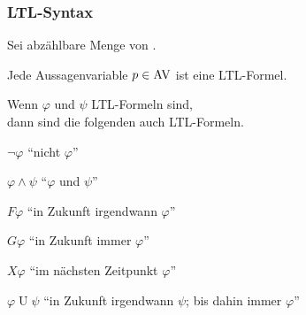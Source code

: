     \begin{frame}
      \frametitle{LTL-Syntax}
      
      Sei \Bmph{\PROP{}} abzählbare Menge von .
      
      \begin{Definition}
        \begin{Itemize}
          \item
            Jede Aussagenvariable $p \in \textup{AV}$ ist eine LTL-Formel.
          \item<2->
            Wenn $\varphi$ und $\psi$ LTL-Formeln sind,\\
            dann sind die folgenden auch LTL-Formeln.
            \begin{Itemize}
              \item
                $\lnot \varphi$       \hfill "`nicht $\varphi$"'
              \item
                $\varphi \land \psi$  \hfill "`$\varphi$ und $\psi$"'
              \item
                $F\varphi$            \hfill "`in Zukunft irgendwann $\varphi$"'
              \item
                $G\varphi$            \hfill "`in Zukunft immer $\varphi$"'
              \item
                $X\varphi$            \hfill "`im nächsten Zeitpunkt $\varphi$"'
              \item
                $\varphi \mathbin U \psi$      \hfill "`in Zukunft irgendwann $\psi$; bis dahin immer $\varphi$"'
            \end{Itemize}
        \end{Itemize}
      \end{Definition}
      
      \par\smallskip

    \end{frame}

